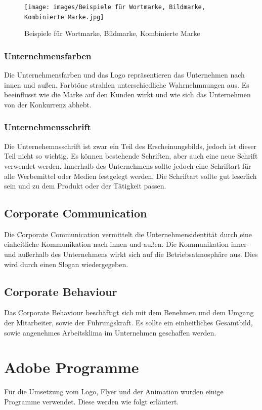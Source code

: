 \begin{figure}[H]
	\centering
	\texttt{[image: images/Beispiele für Wortmarke, Bildmarke, Kombinierte Marke.jpg]}
	\caption[Beispiele für Wortmarke, Bildmarke, Kombinierte Marke]{Beispiele für Wortmarke, Bildmarke, Kombinierte Marke}
	\label{fig:Beispiele für Wortmarke, Bildmarke, Kombinierte Marke}\parencite{Logodesign}
\end{figure}

\subsubsection{Unternehmensfarben}
Die Unternehmensfarben und das Logo repräsentieren das Unternehmen nach innen und außen. Farbtöne strahlen unterschiedliche Wahrnehmnungen aus. Es beeinflusst wie die Marke auf den Kunden wirkt und wie sich das Unternehmen von der Konkurrenz abhebt. \parencite{Unternehmensfarbe}

\subsubsection{Unternehmensschrift}
Die Unternehemnsschrift ist zwar ein Teil des Erscheinungsbilds, jedoch ist dieser Teil nicht so wichtig. Es können bestehende Schriften, aber auch eine neue Schrift verwendet werden. Innerhalb des Unternehmens sollte jedoch eine Schriftart für alle Werbemittel oder Medien festgelegt werden. Die Schriftart sollte gut leserlich sein und zu dem Produkt oder der Tätigkeit passen. \parencite{Unternehmensschrift}
 
\subsection{Corporate Communication}
Die Corporate Communication vermittelt die Unternehmensidentität durch eine einheitliche Kommunikation nach innen und außen. Die Kommunikation inner- und außerhalb des Unternehmens wirkt sich auf die Betriebsatmosphäre aus. Dies wird durch einen Slogan wiedergegeben.

\subsection{Corporate Behaviour}
Das Corporate Behaviour beschäftigt sich mit dem Benehmen und dem Umgang der Mitarbeiter, sowie der Führungskraft. Es sollte ein einheitliches Gesamtbild, sowie angenehmes Arbeitsklima im Unternehmen geschaffen werden. 

\section{Adobe Programme}
Für die Umsetzung vom Logo, Flyer und der Animation wurden einige Programme verwendet. Diese werden wie folgt erläutert.

